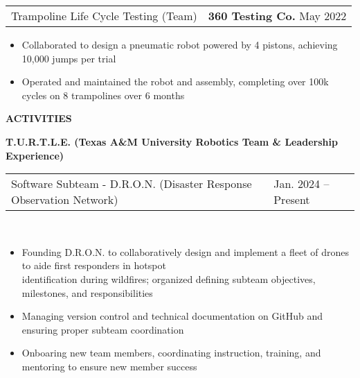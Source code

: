 \documentclass[18pt]{article}
\begin{document}
\begin{tabular}{p{} p{}}
    Trampoline Life Cycle Testing (Team) &
    \textbf{360 Testing Co.} \hfill May 2022
\end{tabular}

\vspace{-0.5\baselineskip}
\begin{itemize}[noitemsep]
    \item Collaborated to design a pneumatic robot powered by 4 pistons, achieving 10,000 jumps per trial
    \item Operated and maintained the robot and assembly, completing over 100k cycles on 8 trampolines over 6 months
\end{itemize}

\vspace{-0.75\baselineskip}
\begin{center}
    \textbf{ACTIVITIES}
    \hrulefill
\end{center}
\vspace{-0.5\baselineskip}

\textbf{T.U.R.T.L.E. (Texas A\&M University Robotics Team \& Leadership Experience)}

\begin{tabular}{p{} p{}}
    Software Subteam - D.R.O.N. (Disaster Response Observation Network) &
    \hfill Jan. 2024 – Present
\end{tabular}\\

\vspace{-0.5\baselineskip}
\begin{itemize}[noitemsep]
    \vspace{-\baselineskip}
        
    \item Founding D.R.O.N. to collaboratively design and implement a fleet of drones to aide first responders in hotspot\\ identification during wildfires; organized defining subteam objectives, milestones, and responsibilities
    \item Managing version control and technical documentation on GitHub and ensuring proper subteam coordination
    \item Onboaring new team members, coordinating instruction, training, and mentoring to ensure new member success
\end{itemize}
\end{document}
